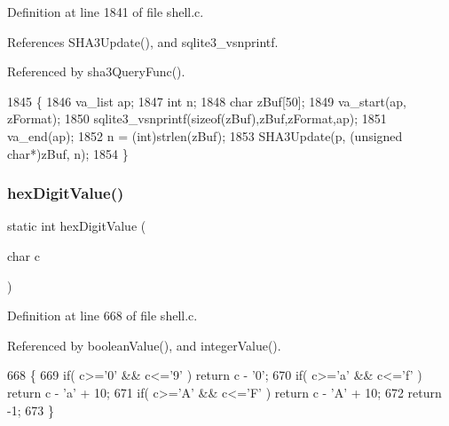 Definition at line 1841 of file shell.\+c.



References S\+H\+A3\+Update(), and sqlite3\+\_\+vsnprintf.



Referenced by sha3\+Query\+Func().


\begin{DoxyCode}
1845  \{
1846   va\_list ap;
1847   \textcolor{keywordtype}{int} n;
1848   \textcolor{keywordtype}{char} zBuf[50];
1849   va\_start(ap, zFormat);
1850   sqlite3_vsnprintf(\textcolor{keyword}{sizeof}(zBuf),zBuf,zFormat,ap);
1851   va\_end(ap);
1852   n = (int)strlen(zBuf);
1853   SHA3Update(p, (\textcolor{keywordtype}{unsigned} \textcolor{keywordtype}{char}*)zBuf, n);
1854 \}
\end{DoxyCode}
\mbox{\label{shell_8c_ad08518ec3a9ff0dc665c54a7eb2a4baa}} 
\subsubsection{hex\+Digit\+Value()}
{\footnotesize\ttfamily static int hex\+Digit\+Value (\begin{DoxyParamCaption}\item[{char}]{c }\end{DoxyParamCaption})\hspace{0.3cm}{\ttfamily [static]}}



Definition at line 668 of file shell.\+c.



Referenced by boolean\+Value(), and integer\+Value().


\begin{DoxyCode}
668                                 \{
669   \textcolor{keywordflow}{if}( c>=\textcolor{charliteral}{'0'} && c<=\textcolor{charliteral}{'9'} ) \textcolor{keywordflow}{return} c - \textcolor{charliteral}{'0'};
670   \textcolor{keywordflow}{if}( c>=\textcolor{charliteral}{'a'} && c<=\textcolor{charliteral}{'f'} ) \textcolor{keywordflow}{return} c - \textcolor{charliteral}{'a'} + 10;
671   \textcolor{keywordflow}{if}( c>=\textcolor{charliteral}{'A'} && c<=\textcolor{charliteral}{'F'} ) \textcolor{keywordflow}{return} c - \textcolor{charliteral}{'A'} + 10;
672   \textcolor{keywordflow}{return} -1;
673 \}
\end{DoxyCode}
\mbox{\label{shell_8c_a10591a12de9d845626f9bac6ead5216e}} 
